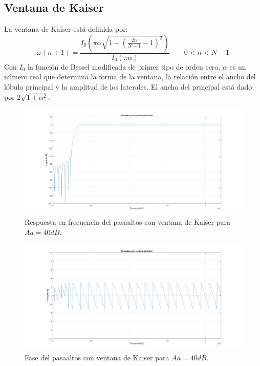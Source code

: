 \subsection{Ventana de Kaiser}
La ventana de Kaiser está definida por:
\begin{equation}
    \omega (n+1)=\frac{I_0 \left( \pi\alpha\sqrt{1-\left(\frac{2n}{N-1}-1 \right)^2} \right)}{I_0\left( \pi \alpha \right) }  \qquad  0<n<N-1
\end{equation}
Con $I_0$ la función de Bessel modificada de primer tipo de orden cero, $\alpha$ es un número real que determina la forma de la ventana, la relación entre el ancho del lóbulo principal y la amplitud de los laterales. El ancho del principal está dado por  $2\sqrt{1+\alpha^2}$.
\begin{figure}[H]
  \includegraphics[scale=.35]{./images/1/kaimoduloAa40.png}
  \caption{Respuesta en frecuencia del pasaaltos con ventana de Kaiser para $Aa=40dB$.}
\end{figure}
\begin{figure}[H]
  \includegraphics[scale=.35]{./images/1/kaifaseAa40.png}
  \caption{Fase del pasaaltos con ventana de Kaiser para $Aa=40dB$.}
\end{figure}

